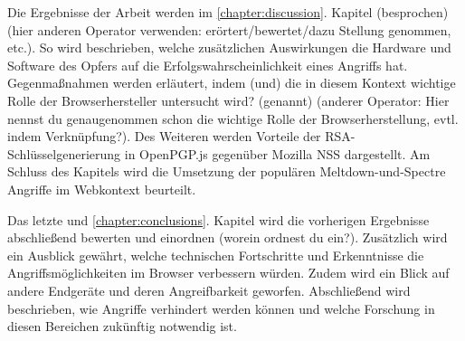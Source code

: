 \par \medskip                       

Die Ergebnisse der Arbeit werden im \ref{chapter:discussion}. Kapitel (besprochen) (hier anderen Operator verwenden: erörtert/bewertet/dazu Stellung genommen, etc.).
So wird beschrieben, welche zusätzlichen Auswirkungen die Hardware und Software des Opfers auf die Erfolgswahrscheinlichkeit eines Angriffs hat.
Gegenmaßnahmen werden erläutert, indem (und) die in diesem Kontext wichtige Rolle der Browserhersteller untersucht wird? (genannt) (anderer Operator: Hier nennst du genaugenommen schon die wichtige Rolle der Browserherstellung, evtl. indem Verknüpfung?).
Des Weiteren werden Vorteile der RSA-Schlüsselgenerierung in OpenPGP.js gegenüber Mozilla NSS dargestellt.
Am Schluss des Kapitels wird die Umsetzung der populären Meltdown-und-Spectre Angriffe im Webkontext beurteilt.

\par \medskip  

Das letzte und \ref{chapter:conclusions}. Kapitel wird die vorherigen Ergebnisse abschließend bewerten und einordnen (worein ordnest du ein?).
Zusätzlich wird ein Ausblick gewährt, welche technischen Fortschritte und Erkenntnisse die Angriffsmöglichkeiten im Browser verbessern würden.
Zudem wird ein Blick auf andere Endgeräte und deren Angreifbarkeit geworfen.
Abschließend wird beschrieben, wie Angriffe verhindert werden können und welche Forschung in diesen Bereichen zukünftig notwendig ist.





